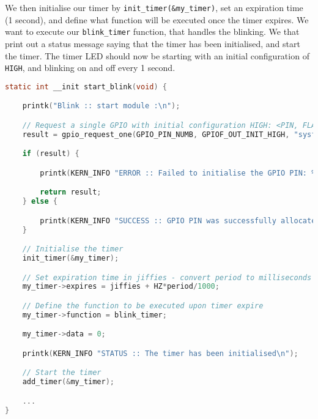 \documentclass[a4paper,oneside,onecolumn]{article}
\newcommand{\code}[1]{\colorbox{codegray}{\texttt{#1}}}
\begin{document}
We then initialise our timer by \code{init\_timer(\&my\_timer)}, set an expiration time (1 second), and define what function will be executed once the timer expires. We want to execute our \code{blink\_timer} function, that handles the blinking. We that print out a status message saying that the timer has been initialised, and start the timer.
\newline
The timer LED should now be starting with an initial configuration of \texttt{HIGH}, and blinking on and off every 1 second.
\begin{lstlisting}[language=c, label={lst:initial_blink}, caption={Initial Configuration of LED}]
static int __init start_blink(void) {

    printk("Blink :: start module :\n");

    // Request a single GPIO with initial configuration HIGH: <PIN, FLAGS, label>
    result = gpio_request_one(GPIO_PIN_NUMB, GPIOF_OUT_INIT_HIGH, "sysfs");

    if (result) {

        printk(KERN_INFO "ERROR :: Failed to initialise the GPIO PIN: %d\n", GPIO_PIN_NUMB);

        return result;
    } else {

        printk(KERN_INFO "SUCCESS :: GPIO PIN was successfully allocated\n");
    }

    // Initialise the timer
    init_timer(&my_timer);

    // Set expiration time in jiffies - convert period to milliseconds
    my_timer->expires = jiffies + HZ*period/1000;

    // Define the function to be executed upon timer expire
    my_timer->function = blink_timer;

    my_timer->data = 0;

    printk(KERN_INFO "STATUS :: The timer has been initialised\n");

    // Start the timer
    add_timer(&my_timer);

    ...
}
\end{lstlisting}
\end{document}
